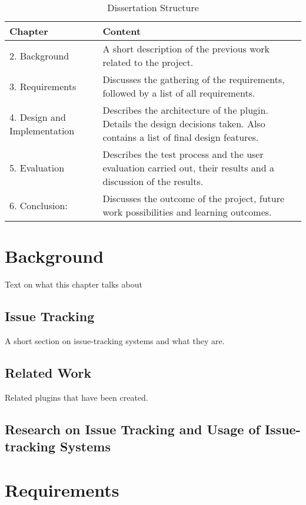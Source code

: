 \documentclass{4thYearProject}
\begin{document}
\begin{table}[H]
\caption{Dissertation Structure}
\centering
\def\arraystretch{1.5}
\begin{tabular}{p{3cm}p{12cm}}
\hline
Chapter & Content \\
\hline
2. Background & A short description of the previous work related to the project. \\
3. Requirements & Discusses the gathering of the requirements, followed by a list of all requirements. \\
4. Design and Implementation & Describes the architecture of the plugin. Details the design decisions taken. Also contains a list of final design features.\\
5. Evaluation & Describes the test process and the user evaluation carried out, their results and a discussion of the results. \\
6. Conclusion: & Discusses the outcome of the project, future work possibilities and learning outcomes.  \\
\hline
\end{tabular}
\label{table:reportStructure}
\end{table}


\chapter{Background}

Text on what this chapter talks about

\section{Issue Tracking}

A short section on issue-tracking systems and what they are.

\section{Related Work}

Related plugins that have been created.

\section{Research on Issue Tracking and Usage of Issue-tracking Systems}

\chapter{Requirements}
\end{document}
